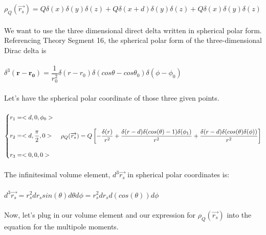 \documentclass[fleqn]{article}
\begin{document}
\begin{enumerate}
      \textcolor{hwColor}{
        \\
        \\
        $
          \rho_Q(\overrightarrow{r_s})=Q \delta(x) \delta(y) \delta(z)+Q \delta(x+d) \delta(y) \delta(z)+Q \delta(x) \delta(y) \delta(z)
        $
        \\
        \\
        We want to use the three dimensional direct delta written in spherical polar form. 
        Referencing Theory Segment 16, the spherical polar form of the
        three-dimensional Dirac delta is 
        \\
        \\
        $
          \delta^3(\mathbf{r}-\mathbf{r_0})=\dfrac{1}{r^2_0} \delta(r-r_0) \delta(cos\theta-cos \theta_0) \delta(\phi-\phi_0)
        $
        \\
        \\
        Let's have the spherical polar coordinate of those three given points. \\
        \\
        $
          \begin{cases}
            r_1=<d,0,\phi_0> \\
            \\
            r_2=<d, \dfrac{\pi}{2}, 0> \\
            \\
            r_3=<0,0,0>
          \end{cases} \\
          \\
          \\
          \\
          \rho_Q(\overrightarrow{r_s})=
          Q \left[-\dfrac{\delta(r)}{r^2}+\dfrac{\delta(r-d) \delta(cos(\theta)-1) \delta(\phi_1)}{r^2}+\dfrac{\delta(r-d)\delta(cos(\theta) \delta(\phi))}{r^2}\right]
        $
        \\
        \\
        The infinitesimal volume element, $d^3\overrightarrow{r_s}$ in spherical polar coordinates is: \\
        \\
        $
          d^3\overrightarrow{r_s}=r^2_s dr_s sin(\theta)d\theta d\phi=r^2_s dr_s d(cos(\theta)) d\phi
        $
        \\
        \\
        Now, let’s plug in our volume element and our expression for $\rho_Q(\overrightarrow{r_s})$
        into the equation for the multipole moments. \\
}
\end{enumerate}
\end{document}
